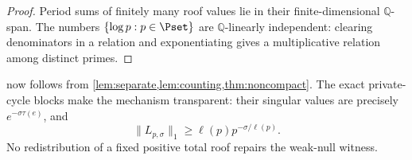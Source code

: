 \begin{proof}
Period sums of finitely many roof values lie in their finite-dimensional
$\mathbb Q$-span.  The numbers $\{\log p:p\in\Pset\}$ are
$\mathbb Q$-linearly independent: clearing denominators in a relation and
exponentiating gives a multiplicative relation among distinct primes.
\end{proof}

 now follows from
\cref{lem:separate,lem:counting,thm:noncompact}.  The exact private-cycle
blocks make the mechanism transparent: their singular values are precisely
$e^{-\sigma\tau(e)}$, and
\[
  \|L_{p,\sigma}\|_1
   \ge \ell(p)p^{-\sigma/\ell(p)}.
\]
No redistribution of a fixed positive total roof repairs the weak-null
witness.
